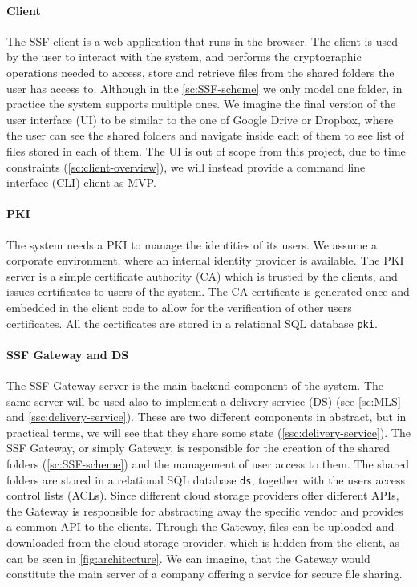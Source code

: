 \paragraph{Client} The SSF client is a web application that
runs in the browser. The client is used by the user to
interact with the system, and performs the cryptographic
operations needed to access, store and retrieve files 
from the shared folders the user has access to.
Although in the \cref{sc:SSF-scheme} we only model one folder,
in practice the system supports multiple ones.
We imagine the final version of the user interface (UI) to
be similar to the one of Google Drive or Dropbox, where
the user can see the shared folders and navigate inside each
of them to see list of files stored in each of them.
The UI is out of scope from this project, due to
time constraints (\cref{sc:client-overview}), we will
instead provide a command line interface (CLI) client
as MVP.

\paragraph{PKI} The system needs a PKI to manage the identities
of its users. We assume a corporate environment, where
an internal identity provider is available. The PKI server
is a simple certificate authority (CA) which is trusted
by the clients, and issues certificates to users of the system.
The CA certificate is generated once and embedded in the client
code to allow for the verification of other users certificates.
All the certificates are stored in a relational SQL database \texttt{pki}.

\paragraph{SSF Gateway and DS}
The SSF Gateway server is the main backend component of the system.
The same server will be used also to implement a delivery service (DS) (see \cref{sc:MLS} and \cref{ssc:delivery-service}).
These are two different components in abstract, but in practical terms, 
we will see that they share some state (\cref{ssc:delivery-service}).
The SSF Gateway, or simply Gateway, is responsible for the
creation of the shared folders (\cref{sc:SSF-scheme}) and the management of user access
to them. The shared folders are stored in a relational SQL
database \texttt{ds}, together with the users access control lists (ACLs).
Since different cloud storage providers offer different APIs,
the Gateway is responsible for abstracting away the specific
vendor and provides a common API to the clients.
Through the Gateway, files can be uploaded and downloaded 
from the cloud storage provider, which is hidden from the client,
as can be seen in \cref{fig:architecture}.
We can imagine, that the Gateway would constitute the main
server of a company offering a service for secure file sharing.

